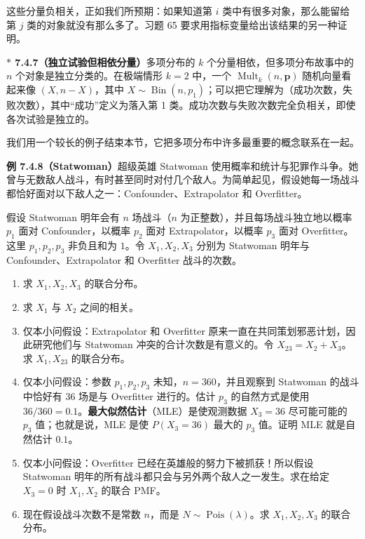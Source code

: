 \documentclass[UTF8,12pt,a4paper,fontset=fandol]{ctexart}
\newcommand{\biohazard}{\ensuremath{\ast}}
\begin{document}
这些分量负相关，正如我们所预期：如果知道第 $i$ 类中有很多对象，那么能留给第 $j$ 类的对象就没有那么多了。习题 65 要求用指标变量给出该结果的另一种证明。

\noindent\textbf{$\biohazard$ 7.4.7（独立试验但相依分量）}\quad 多项分布的 $k$ 个分量相依，但多项分布故事中的 $n$ 个对象是独立分类的。在极端情形 $k=2$ 中，一个 $\operatorname{Mult}_k(n,\mathbf{p})$ 随机向量看起来像 $(X,n-X)$，其中 $X\sim \operatorname{Bin}(n,p_1)$；可以把它理解为（成功次数，失败次数），其中“成功”定义为落入第 1 类。成功次数与失败次数完全负相关，即使各次试验是独立的。

我们用一个较长的例子结束本节，它把多项分布中许多最重要的概念联系在一起。

\noindent\textbf{例 7.4.8（Statwoman）}\quad 超级英雄 Statwoman 使用概率和统计与犯罪作斗争。她曾与无数敌人战斗，有时甚至同时对付几个敌人。为简单起见，假设她每一场战斗都恰好面对以下敌人之一：Confounder、Extrapolator 和 Overfitter。

假设 Statwoman 明年会有 $n$ 场战斗（$n$ 为正整数），并且每场战斗独立地以概率 $p_1$ 面对 Confounder，以概率 $p_2$ 面对 Extrapolator，以概率 $p_3$ 面对 Overfitter。这里 $p_1,p_2,p_3$ 非负且和为 $1$。令 $X_1,X_2,X_3$ 分别为 Statwoman 明年与 Confounder、Extrapolator 和 Overfitter 战斗的次数。

\begin{enumerate}
  \item[(a)] 求 $X_1,X_2,X_3$ 的联合分布。
  \item[(b)] 求 $X_1$ 与 $X_2$ 之间的相关。
  \item[(c)] 仅本小问假设：Extrapolator 和 Overfitter 原来一直在共同策划邪恶计划，因此研究他们与 Statwoman 冲突的合计次数是有意义的。令 $X_{23}=X_2+X_3$。求 $X_1,X_{23}$ 的联合分布。
  \item[(d)] 仅本小问假设：参数 $p_1,p_2,p_3$ 未知，$n=360$，并且观察到 Statwoman 的战斗中恰好有 36 场是与 Overfitter 进行的。估计 $p_3$ 的自然方式是使用 $36/360=0.1$。\textbf{最大似然估计}（MLE）是使观测数据 $X_3=36$ 尽可能可能的 $p_3$ 值；也就是说，MLE 是使 $P(X_3=36)$ 最大的 $p_3$ 值。证明 MLE 就是自然估计 $0.1$。
  \item[(e)] 仅本小问假设：Overfitter 已经在英雄般的努力下被抓获！所以假设 Statwoman 明年的所有战斗都只会与另外两个敌人之一发生。求在给定 $X_3=0$ 时 $X_1,X_2$ 的联合 PMF。
  \item[(f)] 现在假设战斗次数不是常数 $n$，而是 $N\sim \operatorname{Pois}(\lambda)$。求 $X_1,X_2,X_3$ 的联合分布。
\end{enumerate}
\end{document}
